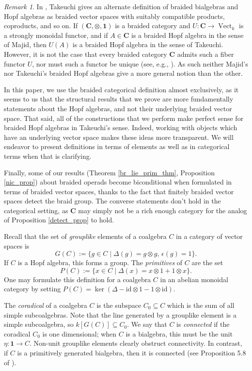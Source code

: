 \documentclass[12pt]{article}
\DeclareMathOperator{\Vect}{Vect}
\newcommand{\bC} {\mathbf{C}}
\newcommand{\one} {\mathbf{1}}
\newcommand{\id}{\mbox{id}}
\theoremstyle{plain}
\theoremstyle{definition}
\theoremstyle{remark}
\newtheorem{rem}[thm]{Remark}
\begin{document}
\begin{rem}

In \cite{takeuchi}, Takeuchi gives an alternate definition of braided bialgebras and Hopf algebras as braided vector spaces with suitably compatible products, coproducts, and so on.  If $(\bC, \otimes, \one)$ is a braided category and $U: \bC \to \Vect_k$ is a strongly monoidal functor, and if $A\in \bC$ is a braided Hopf algebra in the sense of Majid, then $U(A)$ is a braided Hopf algebra in the sense of Takeuchi.  However, it is not the case that every braided category $\bC$ admits such a fiber functor $U$, nor must such a functor be unique (see, e.g., \cite{ostrik_module}).  As such neither Majid's nor Takeuchi's braided Hopf algebras give a more general notion than the other.

In this paper, we use the braided categorical definition almost exclusively, as it seems to us that the structural results that we prove are more fundamentally statements about the Hopf algebras, and not their underlying braided vector space.  That said, all of the constructions that we perform make perfect sense for braided Hopf algebras in Takeuchi's sense.  Indeed, working with objects which have an underlying vector space makes these ideas more transparent.  We will endeavor to present definitions in terms of elements as well as in categorical terms when that is clarifying. 

Finally, some of our results (Theorem \ref{br_lie_prim_thm}, Proposition \ref{nic_prop}) about braided operads become biconditional when formulated in terms of braided vector spaces, thanks to the fact that finitely braided vector spaces detect the braid group.  The converse statements don't hold in the categorical setting, as $\bC$ may simply not be a rich enough category for the analog of Proposition \ref{detect_prop} to hold.

\end{rem}

Recall that the set of \emph{grouplike} elements of a coalgebra $C$ in a category of vector spaces is 
%
$$G(C) := \{g \in C \; | \; \Delta(g) = g \otimes g, \, \epsilon(g) = 1\}.$$
%
If $C$ is a Hopf algebra, this forms a group.  The \emph{primitives} of $C$ are the set\
%
$$P(C) := \{x \in C \; | \; \Delta(x) = x \otimes 1 + 1 \otimes x\}.$$
%
One may formulate this definition for a coalgebra $C$ in an abelian monoidal category by setting $P(C) = \ker(\Delta - \id \otimes 1 -1 \otimes \id)$.

The \emph{coradical} of a coalgebra $C$ is the subspace $C_0 \subseteq C$ which is the sum of all simple subcoalgebras.  Note that the line generated by a grouplike element is a simple subcoalgebra, so $k[G(C)] \subseteq C_0$. 
We say that $C$ is \emph{connected} if the coradical $C_0$ is one dimensional; when $C$ is a bialgebra, this must be the unit $\eta: \one \to C$.   Non-unit grouplike elements clearly obstruct connectivity.  In contrast, if $C$ is a primitively generated bialgebra, then it is connected (see Proposition 5.8 of \cite{ardizzoni_prim_gen}).  
\end{document}
